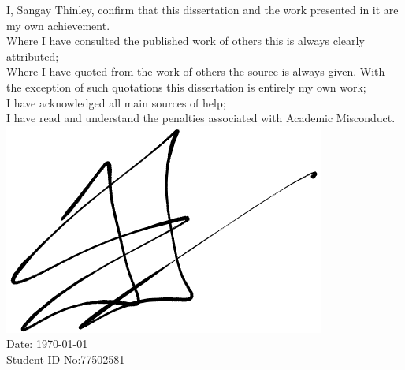 I, Sangay Thinley, confirm that this dissertation and the work presented in it are my own achievement.\\

\noindent Where I have consulted the published work of others this is always clearly attributed;\\

\noindent Where I have quoted from the work of others the source is always given. With the exception of such quotations this dissertation is entirely my own work;\\

\noindent I have acknowledged all main sources of help;\\

\noindent I have read and understand the penalties associated with Academic Misconduct.\\

\includegraphics[width=0.1\linewidth]{assets/figures/signature.png}\\

\noindent Date: \today\\

\noindent Student ID No:77502581